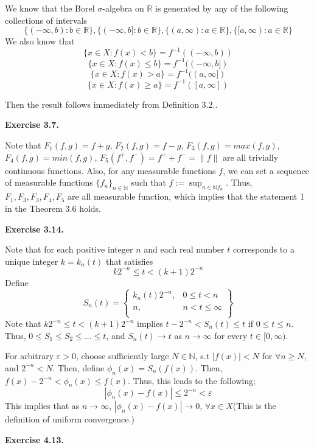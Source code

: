 \documentclass[12pt]{article}
\begin{document}
We know that the Borel $\sigma$-algebra on $\mathbb{R}$ is generated by any of the following collections of intervals
$$
\{(-\infty,b) : b \in \mathbb{R}\}, \{(-\infty,b] : b  \in \mathbb{R}\}, \{(a,\infty) :  a \in \mathbb{R}\}, \{[a, \infty) : a  \in \mathbb{R}\}
$$
We also know that 
$$ \{ x \in X : f(x) < b\} = f^{-1} ((-\infty,b))$$
$$ \{ x \in X : f(x) \leq b\} = f^{-1} ((-\infty,b]) $$
$$ \{ x \in X : f(x) > a\} = f^{-1} ((a,\infty]) $$
$$ \{ x \in X : f(x) \geq a\} = f^{-1} ([a,\infty])$$

 Then the result follows immediately from Definition 3.2..
 
 \textbf{Exercise 3.7.}
 
Note that $F_1(f,g) = f+g$, $F_2(f,g) = f-g$, $F_3(f,g) = max(f,g)$, $F_4(f,g) = min(f,g)$, $F_5(f^{+},f^{-}) = f^{+} + f^{-} = \|f\|$ are all trivially continuous functions. Also, for any measurable functions $f$, we can set a sequence of measurable functions $\{f_n\}_{n \in \mathbb{N}}$ such that $f:= \sup_{n \in \mathbb{N} f_n}$. Thus, $F_1, F_3, F_3, F_4, F_5$ are all measurable function, which implies that the statement 1 in the Theorem 3.6 holds.
 
  \textbf{Exercise 3.14.}

 Note that for each positive integer $n$
 and each real number $t$ corresponds to a unique integer $k= k_n(t)$ that satisfies \\
 \[k 2^{-n} \leq t < (k+1) 2^{-n}\]
 Define
 \[
  S_n(t) = \left.
  \begin{cases}
    k_n(t) 2^{-n}, & 0 \leq t < n \\
    n, & n < t \leq \infty \\
  \end{cases}
  \right\}
\]
Note that $k 2^{-n} \leq t < (k+1) 2^{-n}$ implies $t - 2^{-n} < S_n(t) \leq t$ if $0 \leq t \leq n$. Thus, $0 \leq S_1 \leq S_2 \leq ... \leq t$, and $S_n(t) \rightarrow t$ as $n \rightarrow \infty$ for every $t \in [0,\infty)$.

For arbitrary $\varepsilon > 0$, choose sufficiently large $N \in \mathbb{N}$, s.t $|f(x)| < N$ for $\forall n \geq N$, and $2^{-n} < N$. Then, define $\phi_n(x) = S_n(f(x))$. Then, $f(x) - 2^{-n} < \phi_n(x) \leq f(x)$. Thus, this leads to the following;
\[|\phi_n(x) - f(x)| \leq 2^{-n} < \varepsilon\]
This implies that as $n \rightarrow \infty$, $|\phi_n(x) - f(x)| \rightarrow 0$, $\forall x \in X$(This is the definition of uniform convergence.) 

\textbf{Exercise 4.13.}
\end{document}
